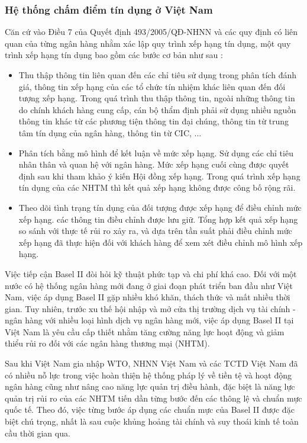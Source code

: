 \subsubsection{Hệ thống chấm điểm tín dụng ở Việt Nam}
Căn cứ vào Điều 7 của Quyết định 493/2005/QĐ-NHNN và các quy định có liên quan của từng ngân hàng nhằm xác lập quy trình xếp hạng tín dụng, một quy trình 
xếp hạng tín dụng bao gồm các bước cơ bản như sau : 
\begin{itemize}
\item Thu thập thông tin liên quan đến các chỉ tiêu sử dụng trong phân tích đánh giá, thông tin xếp hạng của các tổ chức tín nhiệm khác liên quan đến đối tượng xếp hạng. Trong quá trình thu thập thông tin, ngoài những thông tin do chính khách hàng cung cấp, cán bộ thẩm định phải sử dụng nhiều nguồn thông tin khác từ các phương tiện thông tin đại chúng, thông tin từ trung tâm tín dụng của ngân hàng, thông tin từ CIC, ...
\item Phân tích bằng mô hình để kết luận về mức xếp hạng. Sử dụng các chỉ tiêu nhân thân và quan hệ với ngân hàng. Mức xếp hạng cuối cùng được quyết định sau khi tham khảo ý kiến Hội đồng xếp hạng. Trong quá trình xếp hạng tín dụng của các NHTM thì kết quả xếp hạng không được công bố rộng rãi.
\item Theo dõi tình trạng tín dụng của đối tượng được xếp hạng để điều chỉnh mức xếp hạng. các thông tin điều chỉnh được lưu giữ. Tổng hợp kết quả xếp hạng so sánh với thực tế rủi ro xảy ra, và dựa trên tần suất phải điều chỉnh mức xếp hạng đã thực hiện đối với khách hàng để xem xét điều chỉnh mô hình xếp hạng.
\end{itemize}

Việc tiếp cận Basel II đòi hỏi kỹ thuật phức tạp và chi phí khá cao. Đối với một nước có hệ thống ngân hàng mới đang ở giai đoạn phát triển ban đầu như Việt Nam, việc áp dụng Basel II gặp nhiều khó khăn, thách thức và mất nhiều thời gian. Tuy nhiên, trước xu thế hội nhập và mở cửa thị trường dịch vụ tài chính - ngân hàng với nhiều loại hình dịch vụ ngân hàng mới, việc áp dụng Basel II tại Việt Nam là yêu cầu cấp thiết nhằm tăng cường năng lực hoạt động và giảm thiểu rủi ro đối với các ngân hàng thương mại (NHTM).

Sau khi Việt Nam gia nhập WTO, NHNN Việt Nam và các TCTD Việt Nam đã có nhiều nỗ lực trong việc hoàn thiện hệ thống pháp lý về tiền tệ và hoạt động ngân hàng cũng như nâng cao năng lực quản trị điều hành, đặc biệt là năng lực quản trị rủi ro của các NHTM tiến dần từng bước đến các thông lệ và chuẩn mực quốc tế. Theo đó, việc từng bước áp dụng các chuẩn mực của Basel II được đặc biệt chú trọng, nhất là sau cuộc khủng hoảng tài chính và suy thoái kinh tế toàn cầu thời gian qua.

